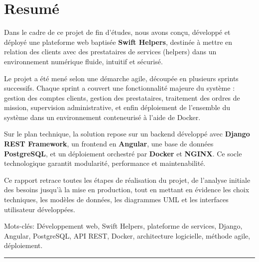 \chapter*{\Large \center Resumé}
Dans le cadre de ce projet de fin d’études, nous avons conçu, développé et déployé une plateforme web baptisée \textbf{Swift Helpers}, destinée à mettre en relation des clients avec des prestataires de services (helpers) dans un environnement numérique fluide, intuitif et sécurisé.

Le projet a été mené selon une démarche agile, découpée en plusieurs sprints successifs. Chaque sprint a couvert une fonctionnalité majeure du système : gestion des comptes clients, gestion des prestataires, traitement des ordres de mission, supervision administrative, et enfin déploiement de l’ensemble du système dans un environnement conteneurisé à l’aide de Docker.

Sur le plan technique, la solution repose sur un backend développé avec \textbf{Django REST Framework}, un frontend en \textbf{Angular}, une base de données \textbf{PostgreSQL}, et un déploiement orchestré par \textbf{Docker} et \textbf{NGINX}. Ce socle technologique garantit modularité, performance et maintenabilité.

Ce rapport retrace toutes les étapes de réalisation du projet, de l’analyse initiale des besoins jusqu’à la mise en production, tout en mettant en évidence les choix techniques, les modèles de données, les diagrammes UML et les interfaces utilisateur développées.

\noindent Mots-clés: Développement web, Swift Helpers, plateforme de services, Django, Angular, PostgreSQL, API REST, Docker, architecture logicielle, méthode agile, déploiement.\\[1mm]
\rule[1em]{38em}{0.5pt}